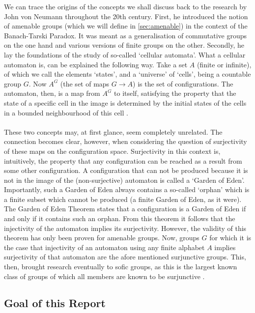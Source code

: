 \documentclass[titlepage, a4paper]{article}
\theoremstyle{definition}
\theoremstyle{remark}
\begin{document}
We can trace the origins of the concepts we shall discuss back to the research by John von Neumann throughout the 20th century. First, he introduced the notion of amenable groups (which we will define in \cref{sec:amenable}) in the context of the Banach-Tarski Paradox. It was meant as a generalisation of commutative groups on the one hand and various versions of finite groups on the other. Secondly, he lay the foundations of the study of so-called ‘cellular automata’. What a cellular automaton is, can be explained the following way. Take a set $A$ (finite or infinite), of which we call the elements ‘states’, and a ‘universe’ of ‘cells’, being a countable group $G$. Now $A^G$ (the set of maps $G \to A$) is the set of configurations. The automaton, then, is a map from $A^G$ to itself, satisfying the property that the state of a specific cell in the image is determined by the initial states of the cells in a bounded neighbourhood of this cell \cite{vonNeumann_1966} .\\
\\
These two concepts may, at first glance, seem completely unrelated. The connection becomes clear, however, when considering the question of surjectivity of these maps on the configuration space. Surjectivity in this context is, intuitively, the property that any configuration can be reached as a result from some other configuration. A configuration that can not be produced because it is not in the image of the (non-surjective) automaton is called a ‘Garden of Eden’. Importantly, such a Garden of Eden always contains a so-called ‘orphan’ which is a finite subset which cannot be produced (a finite Garden of Eden, as it were). The Garden of Eden Theorem \cite[preface]{capraro_lupini_2015}
states that a configuration is a Garden of Eden if and only if it contains such an orphan. From this theorem it follows that the injectivity of the automaton implies its surjectivity. However, the validity of this theorem has only been proven for amenable groups.
Now, groups $G$ for which it is the case that injectivity of an automaton using any finite alphabet $A$ implies surjectivity of that automaton are the afore mentioned surjunctive groups. This, then, brought research eventually to sofic groups, as this is the largest known class of groups of which all members are known to be surjunctive \cite{ceccherini-silberstein_coornaert_2010}.  


\subsection*{Goal of this Report}
\end{document}
